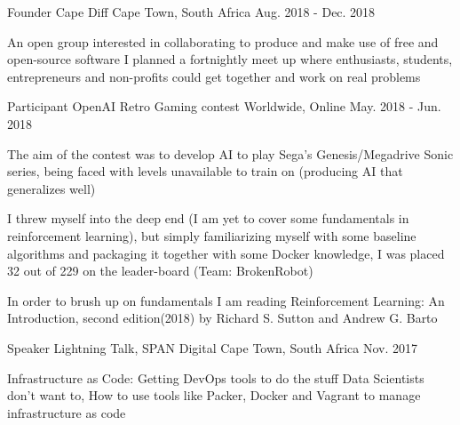 

\begin{cventries}

  \cventry
    {Founder} %
    {Cape Diff} %
    {Cape Town, South Africa} %
    {Aug. 2018 - Dec. 2018} %
    {
      \begin{cvitems} %
        \item {An open group interested in collaborating to produce and make use of free and open-source software
I planned a fortnightly meet up where enthusiasts, students, entrepreneurs and non-profits could get together and work on real problems}
      \end{cvitems}
    }

  \cventry
    {Participant} %
    {OpenAI Retro Gaming contest} %
    {Worldwide, Online} %
    {May. 2018 - Jun. 2018} %
    {
      \begin{cvitems} %
        \item {The aim of the contest was to develop AI to play Sega’s Genesis/Megadrive Sonic series, being faced with levels unavailable to train on
(producing AI that generalizes well)}
        \item {I threw myself into the deep end (I am yet to cover some fundamentals in reinforcement learning), but simply familiarizing myself with some
baseline algorithms and packaging it together with some Docker knowledge, I was placed 32 out of 229 on the leader-board (Team:
BrokenRobot)}
        \item {In order to brush up on fundamentals I am reading Reinforcement Learning: An Introduction, second edition(2018) by Richard S. Sutton and
Andrew G. Barto}
      \end{cvitems}
    }

  \cventry
    {Speaker} %
    {Lightning Talk, SPAN Digital} %
    {Cape Town, South Africa} %
    {Nov. 2017} %
    {
      \begin{cvitems} %
        \item {Infrastructure as Code: Getting DevOps tools to do the stuff Data Scientists don’t want to, How to use tools like Packer, Docker and Vagrant to manage infrastructure as code}
      \end{cvitems}
    }


\end{cventries}
